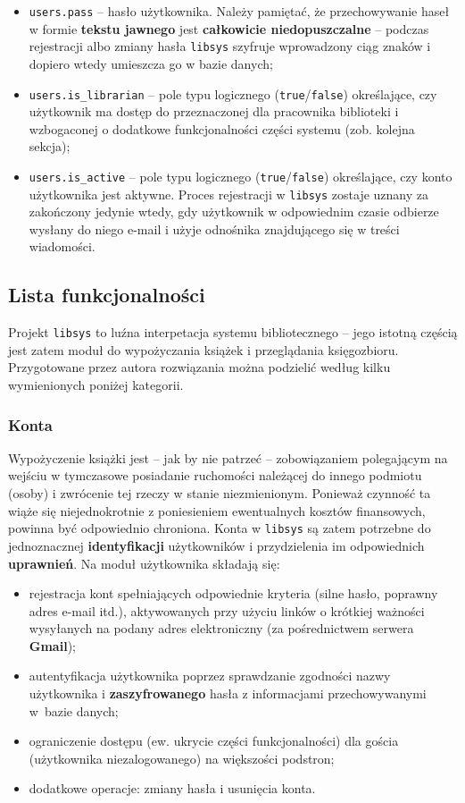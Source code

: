 \documentclass[12pt, a4paper]{article}
\begin{document}
\begin{itemize}
    \item \texttt{users.pass} -- hasło użytkownika. Należy pamiętać, że przechowywanie haseł w formie \textbf{tekstu jawnego} jest \textbf{całkowicie niedopuszczalne} -- podczas rejestracji albo zmiany hasła \texttt{libsys} szyfruje wprowadzony ciąg znaków i dopiero wtedy umieszcza go w bazie danych;
    \item \texttt{users.is\_librarian} -- pole typu logicznego (\texttt{true}/\texttt{false}) określające, czy użytkownik ma dostęp do przeznaczonej dla pracownika biblioteki i wzbogaconej o dodatkowe funkcjonalności części systemu (zob. kolejna sekcja);
    \item \texttt{users.is\_active} -- pole typu logicznego (\texttt{true}/\texttt{false}) określające, czy konto użytkownika jest aktywne. Proces rejestracji w \texttt{libsys} zostaje uznany za zakończony jedynie wtedy, gdy użytkownik w odpowiednim czasie odbierze wysłany do niego e-mail i użyje odnośnika znajdującego się w treści wiadomości.
\end{itemize}

\subsection{Lista funkcjonalności}
Projekt \texttt{libsys} to luźna interpetacja systemu bibliotecznego -- jego istotną częścią jest zatem moduł do wypożyczania książek i przeglądania księgozbioru. Przygotowane przez autora rozwiązania można podzielić według kilku wymienionych poniżej kategorii.

\subsubsection{Konta}
Wypożyczenie książki jest -- jak by nie patrzeć -- zobowiązaniem polegającym na wejściu w tymczasowe posiadanie ruchomości należącej do innego podmiotu (osoby) i zwrócenie tej rzeczy w stanie niezmienionym. Ponieważ czynność ta wiąże się niejednokrotnie z poniesieniem ewentualnych kosztów finansowych, powinna być odpowiednio chroniona. Konta w \texttt{libsys} są zatem potrzebne do jednoznacznej \textbf{identyfikacji} użytkowników i przydzielenia im odpowiednich \textbf{uprawnień}. Na moduł użytkownika składają się:
\begin{itemize}
    \item rejestracja kont spełniających odpowiednie kryteria (silne hasło, poprawny adres e-mail itd.), aktywowanych przy użyciu linków o krótkiej ważności wysyłanych na podany adres elektroniczny (za pośrednictwem serwera \textbf{Gmail});
    \item autentyfikacja użytkownika poprzez sprawdzanie zgodności nazwy użytkownika i \textbf{zaszyfrowanego} hasła z informacjami przechowywanymi w~bazie danych;
    \item ograniczenie dostępu (ew. ukrycie części funkcjonalności) dla gościa (użytkownika niezalogowanego) na większości podstron;
    \item dodatkowe operacje: zmiany hasła i usunięcia konta.
\end{itemize}
\end{document}
